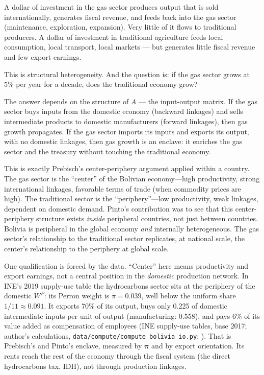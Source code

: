 \documentclass[../structural_economics_book.tex]{subfiles}
\begin{document}
A dollar of investment in the gas sector produces output that is sold internationally, generates fiscal revenue, and feeds back into the gas sector (maintenance, exploration, expansion). Very little of it flows to traditional producers. A dollar of investment in traditional agriculture feeds local consumption, local transport, local markets --- but generates little fiscal revenue and few export earnings.

This is structural heterogeneity. And the question is: if the gas sector grows at 5\% per year for a decade, does the traditional economy grow?

The answer depends on the structure of $A$ --- the input-output matrix. If the gas sector buys inputs from the domestic economy (backward linkages) and sells intermediate products to domestic manufacturers (forward linkages), then gas growth propagates. If the gas sector imports its inputs and exports its output, with no domestic linkages, then gas growth is an enclave: it enriches the gas sector and the treasury without touching the traditional economy.

\begin{prebisch}
This is exactly Prebisch's center-periphery argument applied within a country. The gas sector is the ``center'' of the Bolivian economy---high productivity, strong international linkages, favorable terms of trade (when commodity prices are high). The traditional sector is the ``periphery''---low productivity, weak linkages, dependent on domestic demand. Pinto's contribution was to see that this center-periphery structure exists \textit{inside} peripheral countries, not just between countries. Bolivia is peripheral in the global economy \textit{and} internally heterogeneous. The gas sector's relationship to the traditional sector replicates, at national scale, the center's relationship to the periphery at global scale.

One qualification is forced by the data. ``Center'' here means productivity and export earnings, not a central position in the \textit{domestic} production network. In INE's 2019 supply-use table the hydrocarbons sector sits at the periphery of the domestic $W^P$: its Perron weight is $\pi = 0.039$, well below the uniform share $1/11 \approx 0.091$. It exports 70\% of its output, buys only 0.225 of domestic intermediate inputs per unit of output (manufacturing: 0.558), and pays 6\% of its value added as compensation of employees (INE supply-use tables, base 2017; author's calculations, \texttt{data/compute/compute\_bolivia\_io.py}; \citealp{ine2026sut}). That is Prebisch's and Pinto's enclave, measured by $\boldsymbol{\pi}$ and by export orientation. Its rents reach the rest of the economy through the fiscal system (the direct hydrocarbons tax, IDH), not through production linkages.
\end{prebisch}
\end{document}
